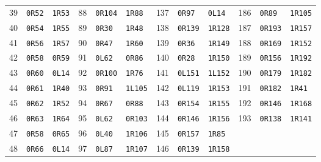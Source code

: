 \begin{center}
\begin{tabular}{rll@{\qquad}rll@{\qquad}rll@{\qquad}rll}
39 & \texttt{0R52} & \texttt{1R53} & 88 & \texttt{0R104} & \texttt{1R88} & 137 & \texttt{0R97} & \texttt{0L14} & 186 & \texttt{0R89} & \texttt{1R105}\\
40 & \texttt{0R54} & \texttt{1R55} & 89 & \texttt{0R30} & \texttt{1R48} & 138 & \texttt{0R139} & \texttt{1R128} & 187 & \texttt{0R193} & \texttt{1R157}\\
41 & \texttt{0R56} & \texttt{1R57} & 90 & \texttt{0R47} & \texttt{1R60} & 139 & \texttt{0R36} & \texttt{1R149} & 188 & \texttt{0R169} & \texttt{1R152}\\
42 & \texttt{0R58} & \texttt{0R59} & 91 & \texttt{0L62} & \texttt{0R86} & 140 & \texttt{0R28} & \texttt{1R150} & 189 & \texttt{0R156} & \texttt{1R192}\\
43 & \texttt{0R60} & \texttt{0L14} & 92 & \texttt{0R100} & \texttt{1R76} & 141 & \texttt{0L151} & \texttt{1L152} & 190 & \texttt{0R179} & \texttt{1R182}\\
44 & \texttt{0R61} & \texttt{1R40} & 93 & \texttt{0R91} & \texttt{1L105} & 142 & \texttt{0L119} & \texttt{1R153} & 191 & \texttt{0R182} & \texttt{1R41}\\
45 & \texttt{0R62} & \texttt{1R52} & 94 & \texttt{0R67} & \texttt{0R88} & 143 & \texttt{0R154} & \texttt{1R155} & 192 & \texttt{0R146} & \texttt{1R168}\\
46 & \texttt{0R63} & \texttt{1R64} & 95 & \texttt{0L62} & \texttt{0R103} & 144 & \texttt{0R146} & \texttt{1R156} & 193 & \texttt{0R138} & \texttt{1R141}\\
47 & \texttt{0R58} & \texttt{0R65} & 96 & \texttt{0L40} & \texttt{1R106} & 145 & \texttt{0R157} & \texttt{1R85} &  &  & \\
48 & \texttt{0R66} & \texttt{0L14} & 97 & \texttt{0L87} & \texttt{1R107} & 146 & \texttt{0R139} & \texttt{1R158} &  &  & \\
\bottomrule
\end{tabular}
\endgroup
\end{center}
